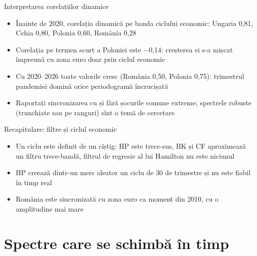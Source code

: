 \begin{frame}{Interpretarea corelațiilor dinamice}
\itemsize{\small}
\begin{itemize}
    \item Înainte de 2020, corelația dinamică pe banda ciclului economic: Ungaria 0{,}81, Cehia 0{,}80, Polonia 0{,}60, România 0{,}28
    \item Corelația pe termen scurt a Poloniei este \ensuremath{-}0{,}14: creșterea ei s-a mișcat împreună cu zona euro doar prin ciclul economic
    \item Cu 2020--2026 toate valorile cresc (România 0{,}50, Polonia 0{,}75): trimestrul pandemiei domină orice periodogramă încrucișată
    \item Raportați sincronizarea cu și fără șocurile comune extreme; spectrele robuste (trunchiate sau pe ranguri) sînt o temă de cercetare
\end{itemize}
\end{frame}

\begin{frame}{Recapitulare: filtre și ciclul economic}
\itemsize{\small}
\begin{itemize}
    \item Un ciclu este definit de un cîștig: HP este trece-sus, BK și CF aproximează un filtru trece-bandă, filtrul de regresie al lui Hamilton nu este niciunul
    \item HP creează dintr-un mers aleator un ciclu de 30 de trimestre și nu este fiabil în timp real
    \item România este sincronizată cu zona euro ca moment din 2010, cu o amplitudine mai mare
\end{itemize}
\end{frame}


\section{Spectre care se schimbă în timp}

